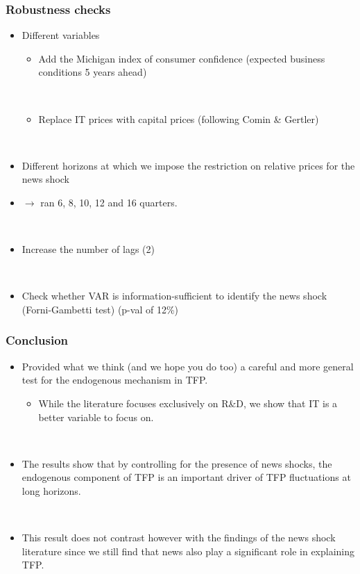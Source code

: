 \documentclass{beamer}
\begin{document}
\begin{frame}
	\frametitle{Robustness checks}

\begin{itemize}
\item Different variables
	\begin{itemize}
	\item Add the Michigan index of consumer confidence (expected business conditions 5 years ahead)
	
	
	\
	
	\item Replace IT prices with capital prices (following Comin \& Gertler)
	\end{itemize}
	
	\
	
\item Different horizons at which we impose the restriction on relative prices for the news shock
\item[] $\rightarrow$ ran  6, 8, 10, 12 and 16 quarters.

\

\item Increase the number of lags (2)

\

\item Check whether VAR is information-sufficient to identify the news shock (Forni-Gambetti test) (p-val of 12\%)
\end{itemize}
   		 	
\end{frame}

\begin{frame}
	\frametitle{Conclusion}
	
\begin{itemize}
\item Provided what we think (and we hope you do too) a careful and more general test for the endogenous mechanism in TFP.
\begin{itemize}
\item While the literature focuses exclusively on R\&D, we show that IT is a better variable to focus on.
\end{itemize}

\ 

\item The results show that by controlling for the presence of news shocks, the endogenous component of TFP is an important driver of TFP fluctuations at long horizons.

\

\item This result does not contrast however with the findings of the news shock literature since we still find that news also play a significant role in explaining TFP.

\end{itemize}
   		 	
\end{frame}
\end{document}
